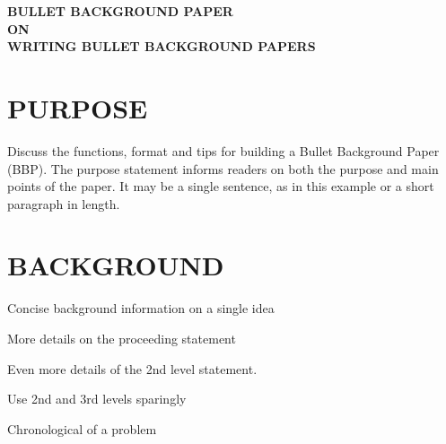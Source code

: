 \documentclass[a4paper,11pt]{extarticle}
\begin{document}

\pagestyle{fancy} %
\fancyhead{} %
\renewcommand{\headrulewidth}{0pt} %
\fancyfoot{} %




\begin{center}
    \textbf{\large BULLET BACKGROUND PAPER}\\[12pt]
    \textbf{\large ON}\\[12pt]
    \textbf{\large WRITING BULLET BACKGROUND PAPERS}\\  %
\end{center}
\medskip



\section*{PURPOSE}

Discuss the functions, format and tips for building a Bullet Background Paper (BBP). The purpose statement informs readers on both the purpose and main points of the paper.  It may be a single sentence, as in this example or a short paragraph in length.


\section*{BACKGROUND}

\begin{myBullets}
    \item Concise background information on a single idea
    \begin{myBullets}
        \item More details on the proceeding statement
        \begin{myBullets}
            \item Even more details of the 2nd level statement. 
            \item Use 2nd and 3rd levels sparingly
        \end{myBullets}
    \end{myBullets}
    \item Chronological of a problem
\end{myBullets}
\end{document}
